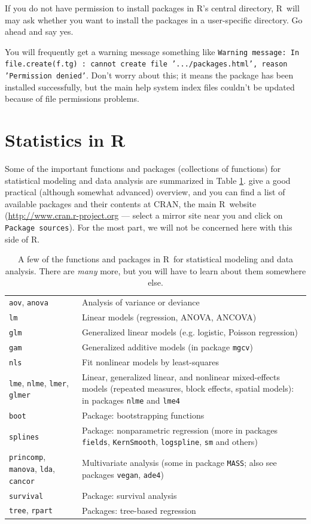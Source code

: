 \documentclass[11pt]{article}\usepackage[]{graphicx}\usepackage[]{color}
\newcommand{\code}[1]{{\tt #1}}
\newcommand\R{{\sf R}}
\numberwithin{exercise}{section}
\begin{document}
If you do not have permission to install packages
in \R's central directory, \R\ will
may ask whether you want to install the
packages in a user-specific directory.
Go ahead and say yes.

You will frequently get a warning message 
something like
\code{Warning message: In file.create(f.tg) :
cannot create file '.../packages.html', reason 'Permission denied'}.
Don't worry about this; it means the package has been installed
successfully,
but the main help system index files couldn't be updated
because of file permissions problems.

\section{Statistics in \R}
Some of the important functions and packages (collections
of functions) for statistical modeling and data analysis are summarized in Table 
\ref{StatModelingFunctions}. \cite{MASS} give a 
good practical (although somewhat advanced) overview, and you 
can find a list of available packages and their contents 
at CRAN, the main \R\ website 
(\url{http://www.cran.r-project.org} --- select a mirror site
near you and click on \code{Package sources}). For the most
part, we will not be concerned here with this side of \R.

\begin{table}[t]
\begin{tabular}{p{100pt}p{310pt}}
\hline
\code{aov}, \code{anova} & Analysis of variance or deviance\\
\code{lm} & Linear models (regression, ANOVA, ANCOVA) \\
\code{glm} &  Generalized linear models (e.g. logistic, Poisson regression) \\
\code{gam} & Generalized additive models (in package \code{mgcv}) \\
\code{nls} & Fit nonlinear models by least-squares \\
\code{lme}, \code{nlme},
\code{lmer}, \code{glmer} & Linear,
generalized linear, and nonlinear mixed-effects models (repeated
measures, block effects, spatial models): in packages \code{nlme}
and \code{lme4} \\
\code{boot} & Package: bootstrapping functions \\
\code{splines}  &  Package: nonparametric regression (more in packages
        \code{fields}, \code{KernSmooth}, \code{logspline}, \code{sm} and others)\\
\code{princomp}, \code{manova}, \code{lda}, \code{cancor}
 & Multivariate analysis
(some in package \code{MASS};
also see packages \code{vegan}, \code{ade4}) \\
\code{survival} & Package: survival analysis \\
\code{tree}, \code{rpart} & Packages: tree-based regression \\
\hline 
\end{tabular}
\caption{A few of the functions and packages in \R\ for statistical
modeling and data analysis. There are \emph{many} more, but you will have
to learn about them somewhere else. } 
\label{StatModelingFunctions}
\end{table}
\end{document}
